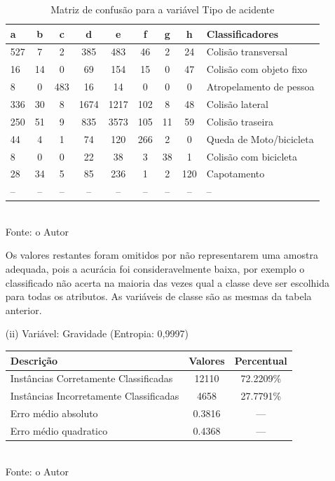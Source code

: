 \begin{enumerate}
		\begin{table}[!ht]
			\centering
			\caption{Matriz de confusão para a variável Tipo de acidente}
			\vspace{1mm}
			\begin{tabular}{l|c|c|c|c|c|c|c|l}
				\hline
				\textbf{a} & \textbf{b} & \textbf{c} & \textbf{d} & \textbf{e} & \textbf{f} & \textbf{g} & \textbf{h} & \textbf{Classificadores}\\
				\hline
				527 & 7 & 2 & 385 & 483 & 46 & 2 & 24 & Colisão transversal \\
				16 & 14 & 0 & 69 & 154 & 15 & 0 & 47 & Colisão com objeto fixo \\
				8 & 0 & 483 & 16 & 14 & 0 & 0 & 0 & Atropelamento de pessoa \\
				336 & 30 & 8 & 1674 & 1217 & 102 & 8 & 48 & Colisão lateral \\
				250 & 51 & 9 & 835 & 3573 & 105 & 11 & 59 & Colisão traseira \\
				44 & 4 & 1 & 74 & 120 & 266 & 2 & 0 & Queda de Moto/bicicleta \\
				8 & 0 & 0 & 22 & 38 & 3 & 38 & 1 & Colisão com bicicleta \\
				28 & 34 & 5 & 85 & 236 & 1 & 2 & 120 & Capotamento \\
				-- & -- & -- & -- & -- & -- & -- & -- & -- \\	
			\end{tabular}
			\\
			\tiny Fonte: o Autor
		\end{table}
		
		Os valores restantes foram omitidos por não representarem uma amostra
		adequada, pois a acurácia foi consideravelmente baixa, por exemplo o classificado não acerta na maioria das vezes qual a classe deve ser escolhida para todas os atributos. As variáveis de classe são as mesmas da tabela
		anterior. \\
					
	\item[(ii)] Variável: Gravidade (Entropia: 0,9997)
	\begin{table}[!ht]
		\centering
		\vspace{1mm}
		\begin{tabular}{l|c|c}
			\hline
			\textbf{Descrição} & \textbf{Valores} & \textbf{Percentual} \\
			\hline
			Instâncias Corretamente Classificadas & 12110 & 72.2209\% \\
			Instâncias Incorretamente Classificadas & 4658 & 27.7791\% \\
			Erro médio absoluto & 0.3816 & ---  \\
			Erro médio quadratico & 0.4368 & --- \\
		\end{tabular}
		\\
		\tiny Fonte: o Autor
	\end{table}
	

\end{enumerate}
